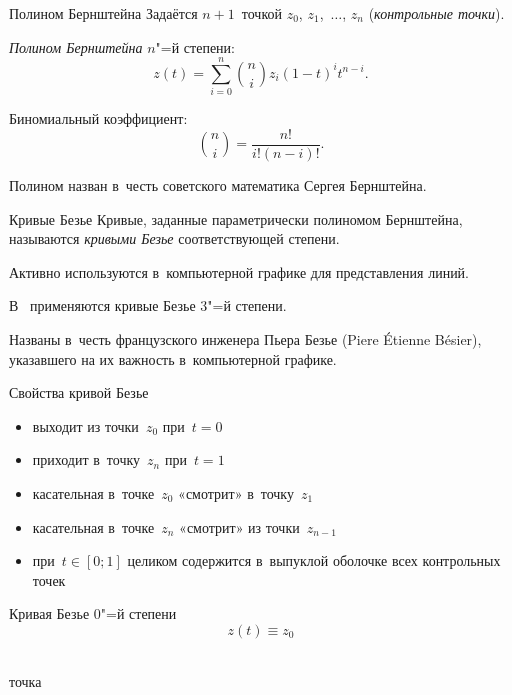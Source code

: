 

\begin{frame}{Полином Бернштейна}
Задаётся $n+1$~точкой $z_0$, $z_1$,~$\ldots$, $z_n$
(\emph{контрольные точки}).

\emph{Полином Бернштейна\/} $n$"=й степени:
	\[
	z(t)=\sum_{i=0}^n\binom niz_i(1-t)^it^{n-i}.
	\]

Биномиальный коэффициент:
	\[
	\binom ni=\frac{n!}{i!(n-i)!}.
	\]

Полином назван в~честь советского математика Сергея Бернштейна.
\end{frame}


\begin{frame}{Кривые Безье}
Кривые, заданные параметрически полиномом Бернштейна, называются \emph{кривыми
Безье\/} соответствующей степени.

Активно используются в~компьютерной графике для представления линий.

В~ применяются кривые Безье $3$"=й степени.

Названы в~честь французского инженера Пьера Безье (Piere Étienne Bésier),
указавшего на их важность в~компьютерной графике.
\end{frame}


\begin{frame}{Свойства кривой Безье}
\begin{itemize}
\item
выходит из точки~$z_0$ при~$t=0$
\item
приходит в~точку~$z_n$ при~$t=1$
\item
касательная в~точке~$z_0$ «смотрит» в~точку~$z_1$
\item
касательная в~точке~$z_n$ «смотрит» из точки~$z_{n-1}$
\item
при~$t\in[0;1]$ целиком содержится в~выпуклой оболочке всех контрольных точек
\end{itemize}
\end{frame}


\begin{frame}{Кривая Безье $0$"=й степени}
{\Large
	\[
	z(t)\equiv z_0
	\]}
\begin{center}
\\[4ex]
точка
\end{center}
\end{frame}


